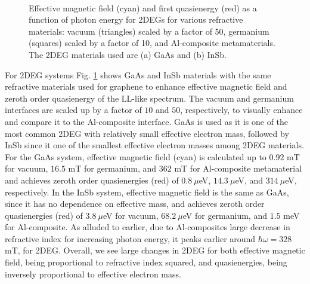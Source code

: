 \documentclass[aps,prb,twocolumn,showpacs,superscriptaddress]{revtex4-2}
\begin{document}
\begin{figure}[h]
  \\
  \caption{Effective magnetic field (cyan) and first quasienergy (red) as a function of photon energy for 2DEGs for various refractive materials: vacuum (triangles) scaled by a factor of 50, germanium (squares) scaled by a factor of 10, and Al-composite metamaterials. The 2DEG materials used are (a) GaAs and (b) InSb.}
  \label{fig:2deg-bfield-energy}
\end{figure}

For 2DEG systems Fig. \ref{fig:2deg-bfield-energy} shows GaAs and InSb materials with the same refractive materials used for graphene to enhance effective magnetic field and zeroth order quasienergy of the LL-like spectrum.
The vacuum and germanium interfaces are scaled up by a factor of $10$ and $50$, respectively, to visually enhance and compare it to the Al-composite interface.
GaAs is used as it is one of the most common 2DEG with relatively small effective electron mass, followed by InSb since it one of the smallest effective electron masses among 2DEG materials.
For the GaAs system, effective magnetic field (cyan) is calculated up to $0.92$ mT for vacuum, $16.5$ mT for germanium, and $362$ mT for Al-composite metamaterial and achieves zeroth order quasienergies (red) of $0.8\ \mu$eV, $14.3\ \mu$eV, and $314\ \mu$eV, respectively.
In the InSb system, effective magnetic field is the same as GaAs, since it has no dependence on effective mass, and achieves zeroth order quasienergies (red) of $3.8\ \mu$eV for vacuum, $68.2\ \mu$eV for germanium, and $1.5$ meV for Al-composite.
As alluded to earlier, due to Al-composites large decrease in refractive index for increasing photon energy, it peaks earlier around $\hbar\omega=328$ mT, for 2DEG.
Overall, we see large changes in 2DEG for both effective magnetic field, being proportional to refractive index squared, and quasienergies, being inversely proportional to effective electron mass.
\end{document}
